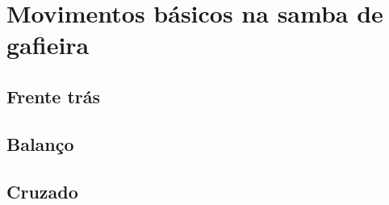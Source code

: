 

\chapter{Movimentos básicos na samba de gafieira}

\section{Frente trás}

\section{Balanço}

\section{Cruzado}

